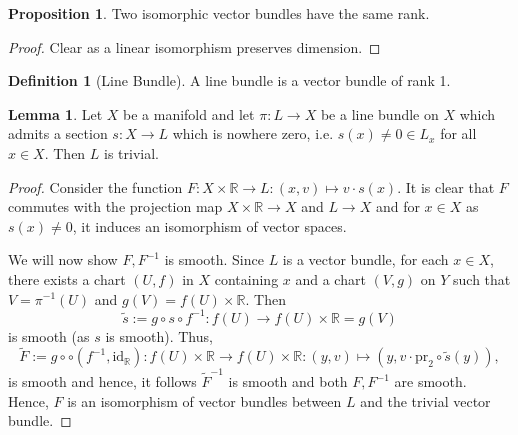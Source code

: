 \documentclass[]{article}
\theoremstyle{definition}
\theoremstyle{definition}
\newtheorem{definition}{Definition}[section]
\newtheorem{lemma}{Lemma}[section]
\newtheorem{proposition}{Proposition}[section]
\begin{document}
\begin{proposition}
  Two isomorphic vector bundles have the same rank.
\end{proposition}
\begin{proof}
  Clear as a linear isomorphism preserves dimension.
\end{proof}

\begin{definition}[Line Bundle]
  A line bundle is a vector bundle of rank 1.
\end{definition}

\begin{lemma}
  Let \(X\) be a manifold and let \(\pi : L \to X\) be a line bundle on 
  \(X\) which admits a section \(s : X \to L\) which is nowhere zero, i.e. 
  \(s(x) \neq 0 \in L_x\) for all \(x \in X\). Then \(L\) is trivial.
\end{lemma}
\begin{proof}
  Consider the function \(F : X \times \mathbb{R} \to L : (x, v) \mapsto v \cdot s(x)\).
  It is clear that \(F\) commutes with the projection map \(X \times \mathbb{R} \to X\) 
  and \(L \to X\) and for \(x \in X\) as \(s(x) \neq 0\), it induces an 
  isomorphism of vector spaces. 

  We will now show \(F, F^{-1}\) is smooth. Since \(L\) is a vector bundle, 
  for each \(x \in X\), there exists a chart \((U, f)\) in \(X\) containing 
  \(x\) and a chart \((V, g)\) on \(Y\) such that \(V = \pi^{-1}(U)\) and 
  \(g(V) = f(U) \times \mathbb{R}\). Then 
  \[\tilde s := g \circ s \circ f^{-1} : f(U) \to f(U) \times \mathbb{R} = g(V)\]
  is smooth (as \(s\) is smooth). Thus, 
  \[\tilde F := g \circ  \circ (f^{-1}, \text{id}_{\mathbb{R}}) : 
    f(U) \times \mathbb{R} \to f(U) \times \mathbb{R} : 
    (y, v) \mapsto (y, v \cdot \text{pr}_2 \circ \tilde s(y)),\]
  is smooth and hence, it follows \(\tilde F^{-1}\) is smooth and both 
  \(F, F^{-1}\) are smooth. Hence, \(F\) is an isomorphism of vector bundles 
  between \(L\) and the trivial vector bundle.
\end{proof}
\end{document}
